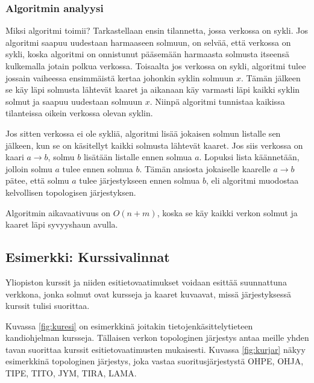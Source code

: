\subsubsection{Algoritmin analyysi}

Miksi algoritmi toimii?
Tarkastellaan ensin tilannetta, jossa verkossa on sykli.
Jos algoritmi saapuu uudestaan harmaaseen solmuun,
on selvää, että verkossa on sykli,
koska algoritmi on onnistunut pääsemään harmaasta solmusta
itseensä kulkemalla jotain polkua verkossa.
Toisaalta jos verkossa on sykli, algoritmi tulee
jossain vaiheessa ensimmäistä kertaa johonkin syklin
solmuun $x$. Tämän jälkeen se käy läpi solmusta
lähtevät kaaret ja aikanaan käy varmasti läpi kaikki syklin
solmut ja saapuu uudestaan solmuun $x$.
Niinpä algoritmi tunnistaa kaikissa tilanteissa oikein verkossa olevan syklin.

Jos sitten verkossa ei ole sykliä, algoritmi lisää jokaisen
solmun listalle sen jälkeen, kun se on käsitellyt
kaikki solmusta lähtevät kaaret.
Jos siis verkossa on kaari $a \rightarrow b$,
solmu $b$ lisätään listalle ennen solmua $a$.
Lopuksi lista käännetään, jolloin solmu $a$
tulee ennen solmua $b$.
Tämän ansiosta jokaiselle kaarelle $a \rightarrow b$ pätee,
että solmu $a$ tulee järjestykseen ennen solmua $b$,
eli algoritmi muodostaa kelvollisen topologisen järjestyksen.

Algoritmin aikavaativuus on $O(n+m)$,
koska se käy kaikki verkon solmut ja kaaret
läpi syvyyshaun avulla.

\subsection{Esimerkki: Kurssivalinnat}

Yliopiston kurssit ja niiden esitietovaatimukset voidaan esittää 
suunnattuna verkkona, jonka solmut ovat kursseja ja kaaret kuvaavat,
missä järjestyksessä kurssit tulisi suorittaa.

Kuvassa \ref{fig:kuresi} on esimerkkinä joitakin
tietojenkäsittely\-tieteen kandiohjelman kursseja.
Tällaisen verkon topologinen järjestys antaa meille
yhden tavan suorittaa kurssit esitietovaatimusten mukaisesti.
Kuvassa \ref{fig:kurjar} näkyy esimerkkinä topologinen järjestys,
joka vastaa suoritusjärjestystä
OHPE, OHJA, TIPE, TITO, JYM, TIRA, LAMA.

